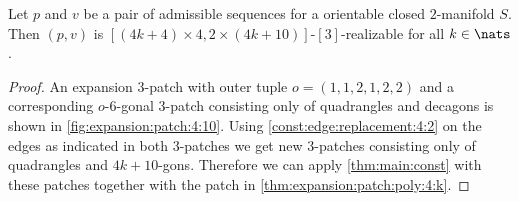 \clearpage
\begin{theorem}
  Let $p$ and $v$ be a pair of admissible sequences for a orientable closed $2$-manifold $S$. Then $(p, v)$ is $[(4k + 4) \times 4, 2 \times (4k+10)]$-$[3]$-realizable for all $k \in \nats$.
  \begin{proof}
    An expansion $3$-patch with outer tuple $o = (1, 1, 2, 1, 2, 2)$ and a corresponding $o$-$6$-gonal $3$-patch consisting only of quadrangles and decagons is shown in \autoref{fig:expansion:patch:4:10}. Using \autoref{const:edge:replacement:4:2} on the edges as indicated in both $3$-patches we get new $3$-patches consisting only of quadrangles and $4k + 10$-gons. Therefore we can apply \autoref{thm:main:const} with these patches together with the patch in \autoref{thm:expansion:patch:poly:4:k}.
  \end{proof}
\end{theorem}
{\par\vspace*{\fill}}
